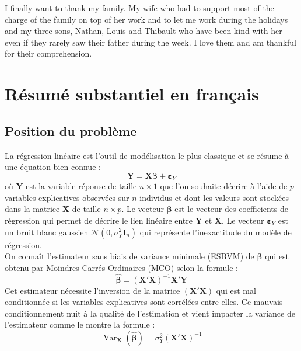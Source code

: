 \documentclass[12pt,a4paper]{report}
\begin{document}
	I finally want to thank my family. My wife who had to support most of the charge of the family on top of her work and to let me work during the holidays and my three sons, Nathan, Louis and Thibault who have been kind with her even if they rarely saw their father during the week. I love them and am thankful for their comprehension.




\tableofcontents
\chapter{Résumé substantiel en français}
	\section{Position du problème}
	La régression linéaire est l'outil de modélisation le plus classique et se résume à une équation bien connue :
	\begin{equation}
		\boldsymbol{Y}=\boldsymbol{X}\boldsymbol{\beta}+\boldsymbol{\varepsilon}_Y
	\end{equation}
	où $\boldsymbol{Y}$ est la variable réponse de taille $n\times 1$ que l'on souhaite décrire à l'aide de $p$ variables explicatives observées sur $n$ individus et dont les valeurs sont stockées dans la matrice $\boldsymbol{X}$ de taille $n\times p$. Le vecteur $\boldsymbol{\beta}$ est le vecteur des coefficients de régression qui permet de décrire le lien linéaire entre $\boldsymbol{Y}$ et $\boldsymbol{X}$. Le vecteur $\boldsymbol{\varepsilon}_Y$  est un bruit blanc gaussien $\mathcal{N}(0,\sigma_Y^2\boldsymbol{I}_n)$ qui représente l'inexactitude du modèle de régression.\\
	
	
	On connaît l'estimateur sans biais de variance minimale (ESBVM) de $\boldsymbol{\beta}$ qui est obtenu par Moindres Carrés Ordinaires (MCO) selon la formule  :
	\begin{equation}
		\hat{\boldsymbol{\beta}}=(\boldsymbol{X}'\boldsymbol{X})^{-1}\boldsymbol{X}'\boldsymbol{Y}
	\end{equation}
	Cet estimateur nécessite l'inversion de la matrice $(\boldsymbol{X}'\boldsymbol{X})$ qui est mal conditionnée si les variables explicatives sont corrélées entre elles. Ce mauvais conditionnement nuit à la qualité de l'estimation et vient impacter la variance de l'estimateur comme le montre la formule :
	\begin{equation}
		\operatorname{Var}_{\boldsymbol{X}}(\hat{\boldsymbol{\beta}})=\sigma_Y^2(\boldsymbol{X}'\boldsymbol{X})^{-1}
	\end{equation}
	
\end{document}
